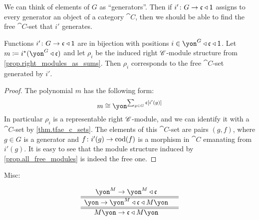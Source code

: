 \documentclass[DynamicalBook]{subfiles}
\begin{document}
We can think of elements of $G$ as ``generators''. Then if $i'\colon G\to\mathfrak{c}\mathbin{\triangleleft}\textsf{1}$ assigns to every generator an object of a category $\cat{C}$, then we should be able to find the free $\cat{C}$-set that $i'$ generates.

\begin{proposition}
Functions $i'\colon G\to\mathfrak{c}\mathbin{\triangleleft}\textsf{1}$ are in bijection with positions $i\in\yon^G\tri\ema{c}\tri\1$. Let $m\coloneqq i^*(\yon^G\tri\ema{c})$ and let $\rho_i$ be the induced right $\mathscr{C}$-module structure from \cref{prop.right_modules_as_sums}. Then $\rho_i$ corresponds to the free $\cat{C}$-set generated by $i'$. 
\end{proposition}
\begin{proof}
The polynomial $m$ has the following form:
\[
m\cong\yon^{\sum_{g\in G}\ema{c}[i'(g)]}
\]
In particular $\rho_i$ is a representable right $\mathscr{C}$-module, and we can identify it with a $\cat{C}$-set by \cref{thm.tfae_c_sets}. The elements of this $\cat{C}$-set are pairs $(g, f)$, where $g\in G$ is a generator and $f\colon i'(g)\to\operatorname{cod}(f)$ is a morphism in $\cat{C}$ emanating from $i'(g)$. It is easy to see that the module structure induced by \cref{prop.all_free_modules} is indeed the free one.
\end{proof}


\begin{proposition}
\end{proposition}


Misc:

\[
\begin{array}{cc}
	\yon^M\to\yon^M\tri \ema{c}&\\\hline\hline
	\yon\to\yon^M\tri \ema{c}\tri M\yon\\\hline\hline
	M\yon\to \ema{c}\tri M\yon
\end{array}
\]
\end{document}
